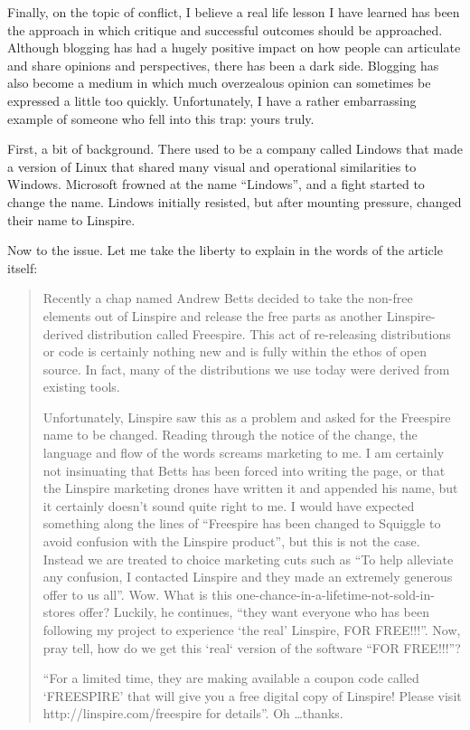 Finally, on the topic of conflict, I believe a real life lesson I have learned
has been the approach in which critique and successful outcomes should be
approached. Although blogging has had a hugely positive impact on how people can
articulate and share opinions and perspectives, there has been a dark side.
Blogging has also become a medium in which much overzealous opinion can
sometimes be expressed a little too quickly. Unfortunately, I have a rather
embarrassing example of someone who fell into this trap: yours truly.

First, a bit of background. There used to be a company called Lindows that made
a version of Linux that shared many visual and operational similarities to
Windows. Microsoft frowned at the name ``Lindows'', and a fight started to
change the name. Lindows initially resisted, but after mounting pressure,
changed their name to Linspire.

Now to the issue. Let me take the liberty to explain in the words of the article
itself:
\begin{quote}
 Recently a chap named Andrew Betts decided to take the non-free elements out of
Linspire and release the free parts as another Linspire-derived distribution
called Freespire. This act of re-releasing distributions or code is certainly
nothing new and is fully within the ethos of open source. In fact, many of the
distributions we use today were derived from existing tools.

Unfortunately, Linspire saw this as a problem and asked for the Freespire name
to be changed. Reading through the notice of the change, the language and flow
of the words screams marketing to me. I am certainly not insinuating that Betts
has been forced into writing the page, or that the Linspire marketing drones
have written it and appended his name, but it certainly doesn’t sound quite
right to me. I would have expected something along the lines of ``Freespire has
been changed to Squiggle to avoid confusion with the Linspire product'', but
this is not the case. Instead we are treated to choice marketing cuts such as
``To help alleviate any confusion, I contacted Linspire and they made an
extremely generous offer to us all''. Wow. What is this
one-chance-in-a-lifetime-not-sold-in-stores offer? Luckily, he continues, ``they
want everyone who has been following my project to experience ‘the real’
Linspire, FOR FREE!!!''. Now, pray tell, how do we get this ‘real‘ version of
the software ``FOR FREE!!!''?

``For a limited time, they are making available a coupon code called ‘FREESPIRE’
that will give you a free digital copy of Linspire! Please visit
http://linspire.com/freespire for details''. Oh \dots thanks.
\end{quote}

